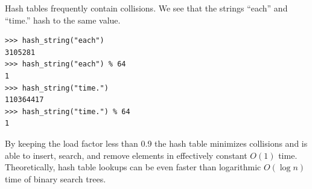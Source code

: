 \documentclass{book}
\begin{document}
Hash tables frequently contain collisions. We see that the strings ``each'' and ``time.'' hash to the same value.

\begin{lstlisting}
>>> hash_string("each")
3105281
>>> hash_string("each") % 64
1
>>> hash_string("time.")
110364417
>>> hash_string("time.") % 64
1
\end{lstlisting}

By keeping the load factor less than 0.9 the hash table minimizes collisions and is able to insert, search, and remove elements in effectively constant $O(1)$ time. Theoretically, hash table lookups can be even faster than logarithmic $O(\log{n})$ time of binary search trees.



\end{document}
